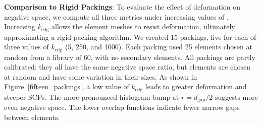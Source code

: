 \textbf{Comparison to Rigid Packings}: 
To evaluate the effect of deformation on negative space, we compute all three metrics under
increasing values of  .  
Increasing $k_\mathrm{edg}$
allows the element meshes to resist deformation, ultimately
approximating a rigid packing algorithm.  We created 15 packings,
five for each of three values of $k_\mathrm{edg}$ (5, 250, and 1000).  Each packing
used 25 elements chosen at random from a library of 60, with
no secondary elements.  
All packings are partly calibrated: they all have the same negative
space ratio, but elements are chosen at random and have some
variation in their sizes.
As shown in Figure~\ref{fifteen_packings}, a low value of
$k_\mathrm{edg}$ leads to greater deformation and steeper SCPs.
The more pronounced histogram bump at $r=d_\mathrm{gap}/2$ suggests
more even negative space.
The lower overlap functions indicate fewer narrow gaps between elements.

